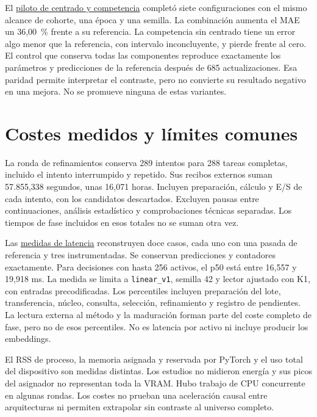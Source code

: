 \documentclass[11pt,a4paper]{report}
\begin{document}
El \href{https://github.com/GonxKZ/mars-titan/blob/8b7e2a5600be568cc1299f2a661da15b5090c45e/reports/research/key-competition-20261020/development-v1/README.md}{piloto de centrado y competencia}
completó siete configuraciones con el mismo alcance de cohorte, una época y
una semilla. La combinación aumenta el MAE un 36,00~\% frente a su referencia.
La competencia sin centrado tiene un error algo menor que la referencia, con
intervalo inconcluyente, y pierde frente al cero. El control que conserva
todas las componentes reproduce exactamente los parámetros y predicciones
de la referencia después de 685 actualizaciones. Esa paridad permite
interpretar el contraste, pero no convierte su resultado negativo en una
mejora. No se promueve ninguna de estas variantes.

\section{Costes medidos y límites comunes}
La ronda de refinamientos conserva 289 intentos para 288 tareas completas,
incluido el intento interrumpido y repetido. Sus recibos externos suman
57.855,338 segundos, unas 16,071 horas. Incluyen preparación, cálculo y E/S
de cada intento, con los candidatos descartados. Excluyen pausas entre
continuaciones, análisis estadístico y comprobaciones técnicas separadas.
Los tiempos de fase incluidos en esos totales no se suman otra vez.

Las \href{https://github.com/GonxKZ/mars-titan/blob/8b7e2a5600be568cc1299f2a661da15b5090c45e/reports/engineering/refinement-selected-latency-20261019/README.md}{medidas de latencia}
reconstruyen doce casos, cada uno con una pasada de referencia y tres
instrumentadas. Se conservan predicciones y contadores exactamente. Para
decisiones con hasta 256 activos, el p50 está entre 16,557 y 19,918 ms.
La medida se limita a \texttt{linear\_v1}, semilla 42 y lector ajustado con K1,
con entradas precodificadas. Los percentiles incluyen preparación del lote,
transferencia, núcleo, consulta, selección, refinamiento y registro de
pendientes. La lectura externa al método y la maduración forman parte del
coste completo de fase, pero no de esos percentiles. No es latencia por activo
ni incluye producir los embeddings.

El RSS de proceso, la memoria asignada y reservada por PyTorch y el uso total
del dispositivo son medidas distintas. Los estudios no midieron energía y
sus picos del asignador no representan toda la VRAM. Hubo trabajo de CPU
concurrente en algunas rondas. Los costes no prueban una aceleración causal
entre arquitecturas ni permiten extrapolar sin contraste al universo
completo.
\end{document}
